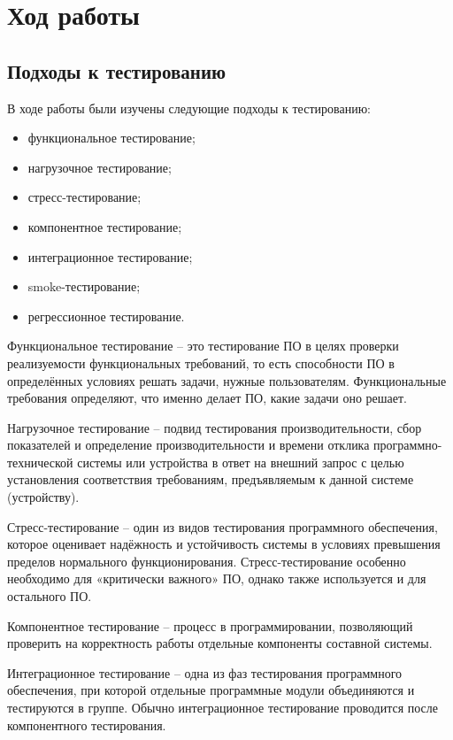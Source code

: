 \section{Ход работы}
\subsection{Подходы к тестированию}
В ходе работы были изучены следующие подходы к тестированию:
\begin{itemize}
    \item функциональное тестирование;
    \item нагрузочное тестирование;
    \item стресс-тестирование;
    \item компонентное тестирование;
    \item интеграционное тестирование;
    \item smoke-тестирование;
    \item регрессионное тестирование.
\end{itemize}

Функциональное тестирование -- это тестирование ПО в целях проверки реализуемости функциональных требований, то есть способности ПО в определённых условиях решать задачи, нужные пользователям. Функциональные требования определяют, что именно делает ПО, какие задачи оно решает.\par

Нагрузочное тестирование -- подвид тестирования производительности, сбор показателей и определение производительности и времени отклика программно-технической системы или устройства в ответ на внешний запрос с целью установления соответствия требованиям, предъявляемым к данной системе (устройству).\par

Стресс-тестирование -- один из видов тестирования программного обеспечения, которое оценивает надёжность и устойчивость системы в условиях превышения пределов нормального функционирования. Стресс-тестирование особенно необходимо для «критически важного» ПО, однако также используется и для остального ПО.\par

Компонентное тестирование -- процесс в программировании, позволяющий проверить на корректность работы отдельные компоненты составной системы.\par

Интеграционное тестирование -- одна из фаз тестирования программного обеспечения, при которой отдельные программные модули объединяются и тестируются в группе. Обычно интеграционное тестирование проводится после компонентного тестирования.\par

